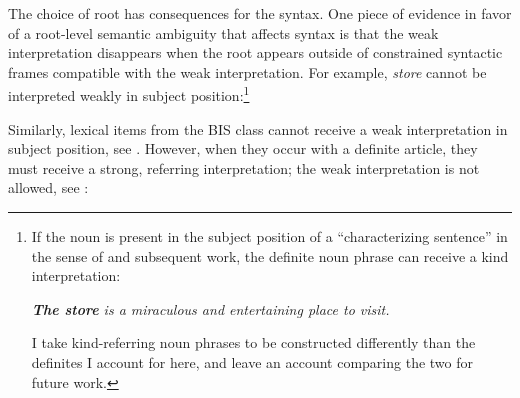 \documentclass[output=paper,
modfonts
]{langscibook}
\begin{document}
The choice of root has consequences for the syntax. One piece of evidence in favor of a root-level semantic ambiguity that affects syntax is that the weak interpretation disappears when the root appears outside of constrained syntactic frames compatible with the weak interpretation. For example, \textit{store} cannot be interpreted weakly in subject position:\footnote{If the noun is present in the subject position of a ``characterizing sentence'' in the sense of \citep{Carlson1977} and subsequent work, the definite noun phrase can receive a kind interpretation: 
\begin{exe} 
\textit{\textbf{The store} is a miraculous and entertaining place to visit.}
\end{exe} 
I take kind-referring noun phrases to be constructed differently than the definites I account for here, and leave an account comparing the two for future work.}

\begin{exe}
\end{exe}

Similarly, lexical items from the BIS class cannot receive a weak interpretation in subject position, see . However, when they occur with a definite article, they must receive a strong, referring interpretation; the weak interpretation is not allowed, see :

\begin{exe}
\end{exe}
\end{document}
